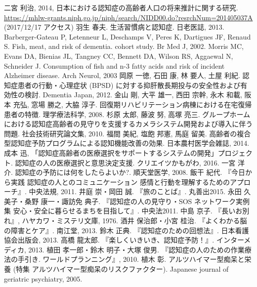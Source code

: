 \documentclass[openany,11pt,papersize]{jsbook}
\begin{document}

\begin{thebibliography}{9}
     二宮 利治, 2014, 日本における認知症の高齢者人口の将来推計に関する研究. \\ \url{https://mhlw-grants.niph.go.jp/niph/search/NIDD00.do?resrchNum=201405037A} (2017/12/17 アクセス)
     羽生 春夫. 生活習慣病と認知症. 日老医誌, 2013.
     Barberger-Gateau P, Letenneur L, Deschamps V, Peres K, Dartigues JF, Renaud S. Fish, meat, and risk of dementia. cohort study. Br Med J, 2002.
     Morris MC, Evans DA, Bienias JL, Tangney  CC, Bennett DA, Wilson RS, Aggaewal N, Schneider J. Consumption of fish and n-3 fatty acids and risk of incident Alzheimer disease. Arch Neurol, 2003
     岡原 一徳, 石田 康, 林 要人, 土屋 利紀. 認知症患者の行動・心理症状 (BPSD) に対する抑肝散長期投与の安全性および有効性の検討. Dementia Japan, 2012.
     金山 剛, 大平 雄一, 西田 宗幹, 永木 和載, 阪本 充弘, 窓場 勝之, 大脇 淳子. 回復期リハビリテーション病棟における在宅復帰患者の特徴. 理学療法科学, 2008.
     杉原 太郎, 藤波 努, 高塚 亮三. グループホームにおける認知症高齢者の見守りを支援するカメラシステム開発および導入に伴う問題. 社会技術研究論文集, 2010.
     福間 美紀, 塩飽 邦憲, 馬庭 留美. 高齢者の複合型認知症予防プログラムによる認知機能改善の効果. 日本農村医学会雑誌, 2014.
     成本 迅, 「認知症高齢者の医療選択をサポートするシステムの開発」プロジェクト. 認知症の人の医療選択と意思決定支援. クリエイツかもがわ, 2016.
     一宮 洋介. 認知症の予防には何をしたらよいか?. 順天堂医学, 2008.
    \bibitem{} 飯干 紀代. 『今日から実践 認知症の人とのコミュニケーション 感情と行動を理解するためのアプローチ』. 中央法規, 2011.
    \bibitem{} 井庭 崇・岡田 誠. 『旅のことば』. 丸善出2015.
    \bibitem{} 永田 久美子・桑野 康一・諏訪免 典子. 『認知症の人の見守り・SOS ネットワーク実例集 安心・安全に暮らせるまちを目指して』. 中央法2011.
    \bibitem{} 中島 京子. 『長いお別れ』, ハヤカワ・ミステリ文庫, 1976.
    \bibitem{} 酒井 保治郎・小宮 桂治. 『よくわかる脳の障害とケア』. 南江堂, 2013.
    \bibitem{} 鈴木 正典. 『認知症のための回想法』. 日本看護協会出版会, 2013.
    \bibitem{} 高橋 龍太郎. 『楽しくいきいき、認知症予防！』. インターメディカ, 2013.
    \bibitem{} 植田 孝一郎・鈴木 明子・大塚 俊男. 『認知症の人のための作業療法の手引き. ワールドプランニング』, 2010.
     植木 彰. アルツハイマー型痴呆と栄養 (特集 アルツハイマー型痴呆のリスクファクター). Japanese journal of geriatric psychiatry, 2005.
\end{thebibliography}
\end{document}
